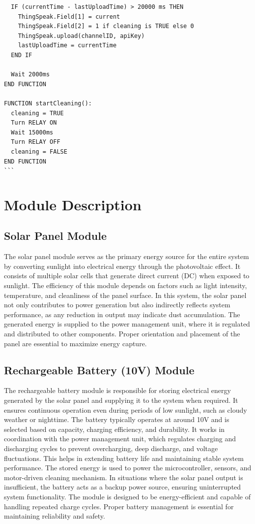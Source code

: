 \documentclass[10pt]{report}
\begin{document}
\begin{sloppypar}
{{{\begin{sloppypar}
\begin{verbatim}
  IF (currentTime - lastUploadTime) > 20000 ms THEN
    ThingSpeak.Field[1] = current
    ThingSpeak.Field[2] = 1 if cleaning is TRUE else 0
    ThingSpeak.upload(channelID, apiKey)
    lastUploadTime = currentTime
  END IF

  Wait 2000ms
END FUNCTION

FUNCTION startCleaning():
  cleaning = TRUE
  Turn RELAY ON
  Wait 15000ms
  Turn RELAY OFF
  cleaning = FALSE
END FUNCTION
```
\end{verbatim}
\section{Module Description}
\subsection{Solar Panel Module}
\hspace{0.5cm}The solar panel module serves as the primary energy source for the entire system by
converting sunlight into electrical energy through the photovoltaic effect. It consists
of multiple solar cells that generate direct current (DC) when exposed to sunlight.
The efficiency of this module depends on factors such as light intensity, temperature, and cleanliness of the panel surface. In this system, the solar panel not only
contributes to power generation but also indirectly reflects system performance, as
any reduction in output may indicate dust accumulation. The generated energy is
supplied to the power management unit, where it is regulated and distributed to other
components. Proper orientation and placement of the panel are essential to maximize
energy capture.
\subsection{Rechargeable Battery (10V) Module}
\hspace{0.5cm}The rechargeable battery module is responsible for storing electrical energy generated by the solar panel and supplying it to the system when required. It ensures
continuous operation even during periods of low sunlight, such as cloudy weather
or nighttime. The battery typically operates at around 10V and is selected based
on capacity, charging efficiency, and durability. It works in coordination with the
power management unit, which regulates charging and discharging cycles to prevent overcharging, deep discharge, and voltage fluctuations. This helps in extending
battery life and maintaining stable system performance. The stored energy is used
to power the microcontroller, sensors, and motor-driven cleaning mechanism. In
situations where the solar panel output is insufficient, the battery acts as a backup
power source, ensuring uninterrupted system functionality. The module is designed
to be energy-efficient and capable of handling repeated charge cycles. Proper battery
management is essential for maintaining reliability and safety.


\end{sloppypar}}}}
\end{sloppypar}
\end{document}
